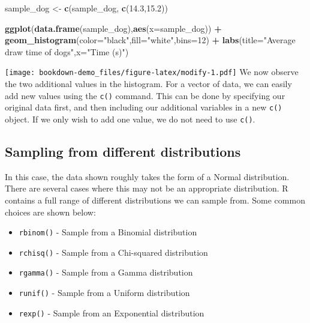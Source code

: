 \documentclass[
]{book}
\newenvironment{Shaded}{\begin{snugshade}}{\end{snugshade}}
\newcommand{\DataTypeTok}[1]{\textcolor[rgb]{0.13,0.29,0.53}{#1}}
\newcommand{\DecValTok}[1]{\textcolor[rgb]{0.00,0.00,0.81}{#1}}
\newcommand{\FloatTok}[1]{\textcolor[rgb]{0.00,0.00,0.81}{#1}}
\newcommand{\KeywordTok}[1]{\textcolor[rgb]{0.13,0.29,0.53}{\textbf{#1}}}
\newcommand{\NormalTok}[1]{#1}
\newcommand{\OperatorTok}[1]{\textcolor[rgb]{0.81,0.36,0.00}{\textbf{#1}}}
\newcommand{\StringTok}[1]{\textcolor[rgb]{0.31,0.60,0.02}{#1}}
\providecommand{\tightlist}{%
  \setlength{\itemsep}{0pt}\setlength{\parskip}{0pt}}
\begin{document}
\begin{Shaded}
\begin{Highlighting}[]
\NormalTok{sample_dog <-}\StringTok{ }\KeywordTok{c}\NormalTok{(sample_dog, }\KeywordTok{c}\NormalTok{(}\FloatTok{14.3}\NormalTok{,}\FloatTok{15.2}\NormalTok{))}

\KeywordTok{ggplot}\NormalTok{(}\KeywordTok{data.frame}\NormalTok{(sample_dog),}\KeywordTok{aes}\NormalTok{(}\DataTypeTok{x=}\NormalTok{sample_dog)) }\OperatorTok{+}\StringTok{ }\KeywordTok{geom_histogram}\NormalTok{(}\DataTypeTok{color=}\StringTok{"black"}\NormalTok{,}\DataTypeTok{fill=}\StringTok{"white"}\NormalTok{,}\DataTypeTok{bins=}\DecValTok{12}\NormalTok{) }\OperatorTok{+}\StringTok{ }
\StringTok{            }\KeywordTok{labs}\NormalTok{(}\DataTypeTok{title=}\StringTok{"Average draw time of dogs"}\NormalTok{,}\DataTypeTok{x=}\StringTok{"Time (s)"}\NormalTok{)}
\end{Highlighting}
\end{Shaded}

\texttt{[image: bookdown-demo\_files/figure-latex/modify-1.pdf]}
We now observe the two additional values in the histogram. For a vector of data, we can easily add new values using the \texttt{c()} command. This can be done by specifying our original data first, and then including our additional variables in a new \texttt{c()} object. If we only wish to add one value, we do not need to use \texttt{c()}.

\hypertarget{sampling-from-different-distributions}{%
\subsection{Sampling from different distributions}\label{sampling-from-different-distributions}}

In this case, the data shown roughly takes the form of a Normal distribution. There are several cases where this may not be an appropriate distribution. R contains a full range of different distributions we can sample from. Some common choices are shown below:

\begin{itemize}
\tightlist
\item
  \texttt{rbinom()} - Sample from a Binomial distribution
\item
  \texttt{rchisq()} - Sample from a Chi-squared distribution
\item
  \texttt{rgamma()} - Sample from a Gamma distribution
\item
  \texttt{runif()} - Sample from a Uniform distribution
\item
  \texttt{rexp()} - Sample from an Exponential distribution
\end{itemize}
\end{document}
